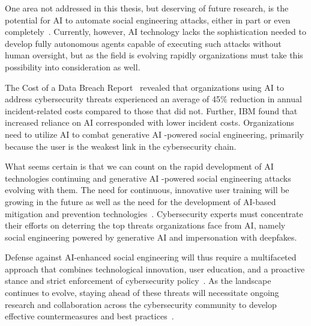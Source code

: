 One area not addressed in this thesis, but deserving of future research, is the potential for AI to automate social engineering attacks, either in part or even completely~\citep{mirsky_Threat_Offensive_AI_Organizations_2023}. Currently, however, AI technology lacks the sophistication needed to develop fully autonomous agents capable of executing such attacks without human oversight, but as the field is evolving rapidly organizations must take this possibility into consideration as well.


The Cost of a Data Breach Report~\citep{ibm_Cost_Data_Breach_Report_2024} revealed that organizations using AI to address cybersecurity threats experienced an average of 45\% reduction in annual incident-related costs compared to those that did not. Further, IBM found that increased reliance on AI corresponded with lower incident costs. Organizations need to utilize AI to combat generative AI -powered social engineering, primarily because the user is the weakest link in the cybersecurity chain.

What seems certain is that we can count on the rapid development of AI technologies continuing and generative AI -powered social engineering attacks evolving with them. The need for continuous, innovative user training will be growing in the future as well as the need for the development of AI-based mitigation and prevention technologies~\citep{mirsky_Threat_Offensive_AI_Organizations_2023}. Cybersecurity experts must concentrate their efforts on deterring the top threats organizations face from AI, namely social engineering powered by generative AI and impersonation with deepfakes.

%
%
Defense against AI-enhanced social engineering will thus require a multifaceted approach that combines technological innovation, user education, and a proactive stance and strict enforcement of cybersecurity policy~\citep{blauth_AI_Crime_Overview_Malicious_Use_Abuse_2022}. As the landscape continues to evolve, staying ahead of these threats will necessitate ongoing research and collaboration across the cybersecurity community to develop effective countermeasures and best practices~\citep{fakhouri_AI_Driven_Solutions_SE_Attacks_2024}.
